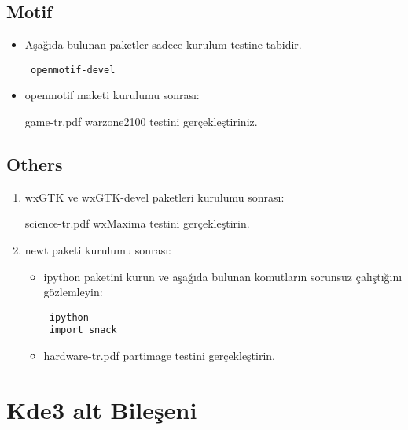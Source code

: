 \documentclass[a4paper,10pt]{article}
\begin{document}
\subsection*{Motif}
\begin{itemize}

\item Aşağıda bulunan paketler sadece kurulum testine tabidir.

\begin{verbatim}
 openmotif-devel
\end{verbatim}

\item openmotif maketi kurulumu sonrası:

game-tr.pdf warzone2100 testini gerçekleştiriniz.

\end{itemize}




\subsection*{Others}
\begin{enumerate}
\item wxGTK ve wxGTK-devel paketleri kurulumu sonrası:

science-tr.pdf wxMaxima testini gerçekleştirin.

 \item newt paketi kurulumu sonrası:
\begin{itemize}
 \item ipython paketini kurun ve aşağıda bulunan komutların sorunsuz çalıştığını gözlemleyin:
\begin{verbatim}
 ipython
 import snack
\end{verbatim}
  \item hardware-tr.pdf partimage testini gerçekleştirin.

\end{itemize}

\end{enumerate}

\section{Kde3 alt Bileşeni}
\end{document}

